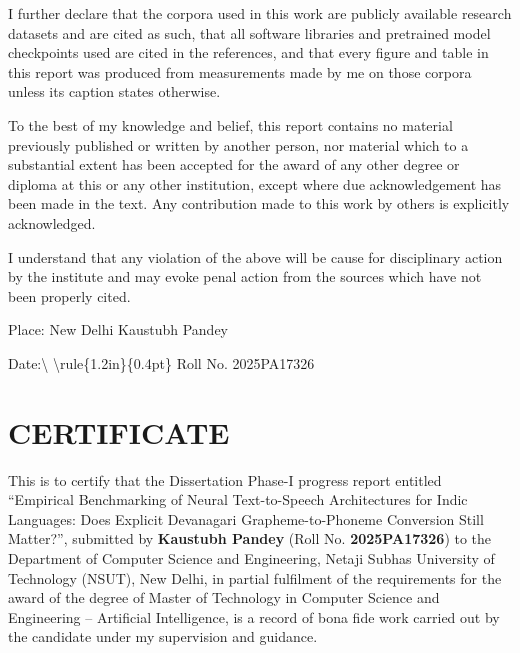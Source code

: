 \documentclass[12pt,a4paper]{article}
\begin{document}
I further declare that the corpora used in this work are publicly available research datasets and are cited as such, that all software libraries and pretrained model checkpoints used are cited in the references, and that every figure and table in this report was produced from measurements made by me on those corpora unless its caption states otherwise.

To the best of my knowledge and belief, this report contains no material previously published or written by another person, nor material which to a substantial extent has been accepted for the award of any other degree or diploma at this or any other institution, except where due acknowledgement has been made in the text. Any contribution made to this work by others is explicitly acknowledged.

I understand that any violation of the above will be cause for disciplinary action by the institute and may evoke penal action from the sources which have not been properly cited.

\vspace{0.35in}

\noindent Place: New Delhi \hfill Kaustubh Pandey

\vspace{0.28in}

\noindent Date:\textbackslash{} \textbackslash{}rule\{1.2in\}\{0.4pt\} \hfill Roll No. 2025PA17326

\vspace{0.28in}

\clearpage

\section*{\centering CERTIFICATE}

This is to certify that the Dissertation Phase-I progress report entitled “Empirical Benchmarking of Neural Text-to-Speech Architectures for Indic Languages: Does Explicit Devanagari Grapheme-to-Phoneme Conversion Still Matter?”, submitted by \textbf{Kaustubh Pandey} (Roll No. \textbf{2025PA17326}) to the Department of Computer Science and Engineering, Netaji Subhas University of Technology (NSUT), New Delhi, in partial fulfilment of the requirements for the award of the degree of Master of Technology in Computer Science and Engineering – Artificial Intelligence, is a record of bona fide work carried out by the candidate under my supervision and guidance.
\end{document}
